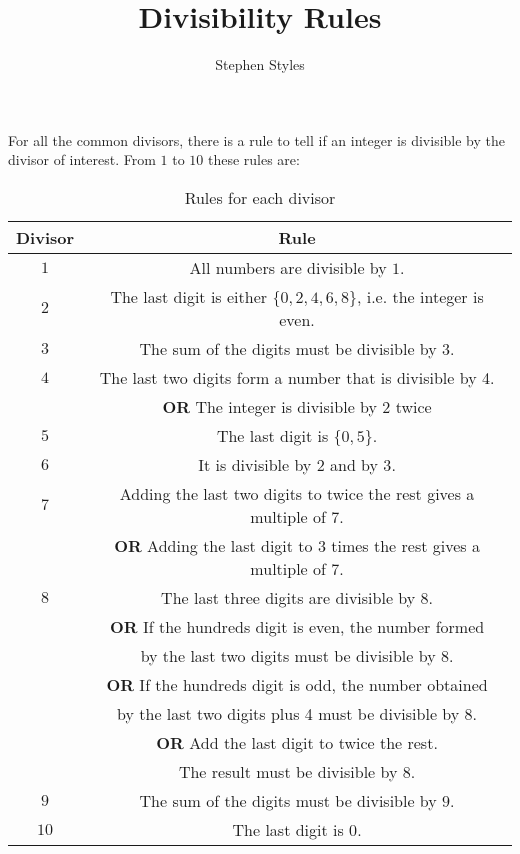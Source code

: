 \documentclass[16pt]{article}
\title{Divisibility Rules}
\author{Stephen Styles}
\theoremstyle{remark}
\begin{document}
\maketitle

For all the common divisors, there is a rule to tell if an integer is divisible by the divisor of interest. From $1$ to $10$ these rules are:

\begin{table}[h!]
\centering
\begin{tabular}{||c | c||} 
 \hline
 Divisor & Rule \\ [0.5ex] 
 \hline\hline
 $1$ & All numbers are divisible by $1$.\\
 \hline
 $2$ & The last digit is either $\{0,2,4,6,8\}$, i.e. the integer is even.\\
 \hline
 $3$ & The sum of the digits must be divisible by $3$.\\ 
 \hline
 $4$ & The last two digits form a number that is divisible by 4.\\
 & \textbf{OR} The integer is divisible by $2$ twice \\
 \hline
 $5$ & The last digit is $\{0, 5\}$.\\
 \hline
 $6$ & It is divisible by $2$ and by $3$. \\
 \hline
 $7$ & Adding the last two digits to twice the rest gives a multiple of $7$.\\
 & \textbf{OR} Adding the last digit to $3$ times the rest gives a multiple of $7$. \\
 \hline
 $8$ & The last three digits are divisible by $8.$\\
 & \textbf{OR} If the hundreds digit is even, the number formed\\
 & by the last two digits must be divisible by $8$.\\
 & \textbf{OR} If the hundreds digit is odd, the number obtained\\
 & by the last two digits plus 4 must be divisible by $8$.\\
 & \textbf{OR} Add the last digit to twice the rest.\\
 & The result must be divisible by 8.\\
 \hline
 $9$ & The sum of the digits must be divisible by $9$. \\
 \hline
 $10$ & The last digit is $0$.\\
 \hline
\end{tabular}
\caption{Rules for each divisor}
\label{table:1}
\end{table}
\end{document}
